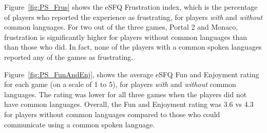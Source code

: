 
Figure~\ref{fig:PS_Frus} shows the eSFQ Frustration index, which is the percentage of players who reported the experience as frustrating, for players \textit{with} and \textit{without} common languages.
For two out of the three games, Portal 2 and Monaco, frustration is significantly higher for players without common languages than than those who did. In fact, none of the players with a common spoken languages reported any of the games as frustrating. 

Figure~\ref{fig:PS_FunAndEnj}, shows the average eSFQ Fun and Enjoyment rating for each game (on a scale of 1 to 5), for players \textit{with} and \textit{without} common languages. The rating was lower for all three games when the players did not have common languages. Overall, the Fun and Enjoyment rating was 3.6 vs 4.3 for players without common languages compared to those who could communicate using a common spoken language.



